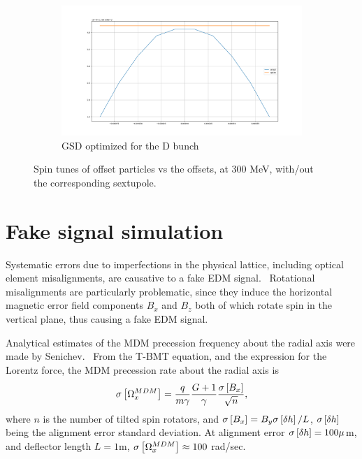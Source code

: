 \documentclass{article}
\begin{document}
\begin{figure}\ContinuedFloat
  \begin{subfigure}[b]{\textwidth}\centering
    \includegraphics[width=\textwidth]{img/SPINTUNE_D_GSD_optim}
    \caption{GSD optimized for the D bunch}
  \end{subfigure}
  \caption{Spin tunes of offset particles vs the offsets, at 300 MeV, with/out the corresponding sextupole.\label{fig:OptSext}}
\end{figure}


\section{Fake signal simulation}\label{sec:SystErr:FakeSignalSim}

Systematic errors due to imperfections in the physical lattice, including optical element misalignments, are causative to a fake EDM signal.~\citep[p.~230]{Eremey:Thesis} Rotational misalignments are particularly problematic, since they induce the horizontal magnetic error field components $B_x$ and $B_z$ both of which rotate spin in the vertical plane, thus causing a fake EDM signal.

Analytical estimates of the MDM precession frequency about the radial axis were made by Senichev.~\cite{Senichev:FDM} From the T-BMT equation, and the expression for the Lorentz force, the MDM precession rate about the radial axis is
\begin{equation}
  \SD{\W_x^{MDM}} = \frac{q}{m\gamma}\frac{G+1}{\gamma}\frac{\SD{B_x}}{\sqrt{n}},
\end{equation}
where $n$ is the number of tilted spin rotators, and $\SD{B_x} = B_y \SD{\delta h}/L$, $\SD{\delta h}$  being the alignment error standard deviation. At alignment error $\SD{\delta h} = 100 \mu$m, and deflector length $L=1$m, $\SD{\W_x^{MDM}} \approx 100$ rad/sec.~\cite{Senichev:FDM}
\end{document}
